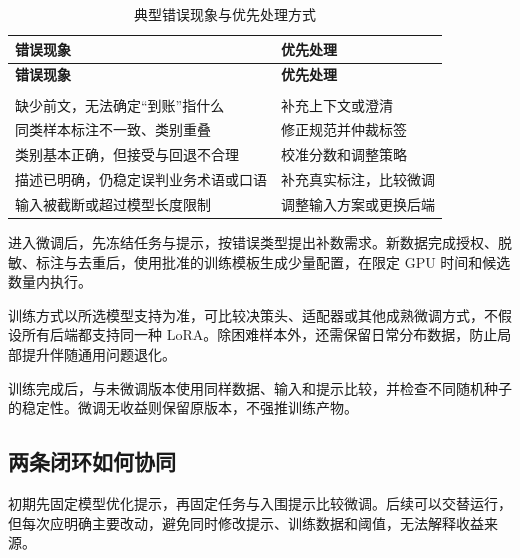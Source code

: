 \documentclass[UTF8,a4paper,11pt,fontset=windows]{ctexart}
\begin{document}
{\small\setlength{\tabcolsep}{4pt}\renewcommand{\arraystretch}{1.28}
\begin{longtable}{>{\raggedright\arraybackslash}p{0.420\dimexpr\linewidth-4\tabcolsep\relax}>{\raggedright\arraybackslash}p{0.580\dimexpr\linewidth-4\tabcolsep\relax}}
\caption{典型错误现象与优先处理方式}\label{tab:error-diagnosis}\\
\toprule
\textbf{错误现象} & \textbf{优先处理} \\
\midrule
\endfirsthead
\toprule
\textbf{错误现象} & \textbf{优先处理} \\
\midrule
\endhead
\midrule\multicolumn{2}{r}{\scriptsize\color{Muted}续下页}\\\endfoot
\bottomrule\endlastfoot
缺少前文，无法确定“到账”指什么 & 补充上下文或澄清 \\
同类样本标注不一致、类别重叠 & 修正规范并仲裁标签 \\
类别基本正确，但接受与回退不合理 & 校准分数和调整策略 \\
描述已明确，仍稳定误判业务术语或口语 & 补充真实标注，比较微调 \\
输入被截断或超过模型长度限制 & 调整输入方案或更换后端 \\
\end{longtable}}

进入微调后，先冻结任务与提示，按错误类型提出补数需求。新数据完成授权、脱敏、标注与去重后，使用批准的训练模板生成少量配置，在限定 GPU 时间和候选数量内执行。


训练方式以所选模型支持为准，可比较决策头、适配器或其他成熟微调方式，不假设所有后端都支持同一种 LoRA。除困难样本外，还需保留日常分布数据，防止局部提升伴随通用问题退化。


训练完成后，与未微调版本使用同样数据、输入和提示比较，并检查不同随机种子的稳定性。微调无收益则保留原版本，不强推训练产物。


\subsection{两条闭环如何协同}

初期先固定模型优化提示，再固定任务与入围提示比较微调。后续可以交替运行，但每次应明确主要改动，避免同时修改提示、训练数据和阈值，无法解释收益来源。
\end{document}
